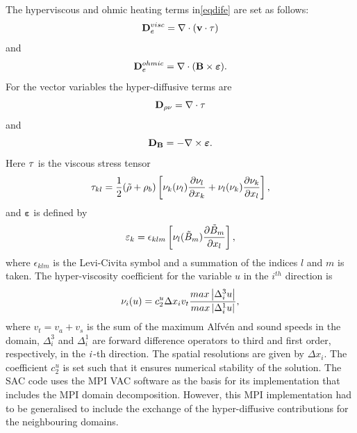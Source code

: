 The hyperviscous and ohmic heating terms in\eqref{eqdife} are set as follows:
\begin{equation}
{\bf D}_{e}^{visc}=\nabla \cdot ({\bf v}\cdot \tau )
\end{equation}
and
\begin{equation}
{\bf D}_{e}^{ohmic}=\nabla \cdot ({\bf B}\times \boldsymbol{\varepsilon} ).
\end{equation}
For the vector variables the hyper-diffusive terms are
\begin{equation}
{\bf D}_{\rho \nu}=\nabla \cdot {\bf \tau}
\end{equation}
and
\begin{equation}\label{eqdifb}
{\bf D}_{\bf B}= -\nabla \times {\boldsymbol{ \varepsilon}}.
\end{equation}
Here $ \bf \tau $ is the viscous stress tensor
\begin{equation}
\tau _{kl}={{1}\over{2}}(\tilde{\rho}+\rho _{b})\left[  \nu _{k}(\nu _{l}) {{\partial \nu_{l}}\over{\partial x_{k}}} +    \nu _{l}(\nu _{k}) {{\partial \nu_{k}}\over{\partial x_{l}}}     \right],
\end{equation}
and $  \boldsymbol{\varepsilon} $ is defined by
\begin{equation}
\varepsilon _{k}=\epsilon_{klm}\left[  \nu _{l}(\tilde{B}_{m})  {{\partial \tilde{B}_{m}}\over{\partial x_{l}}} \right],
\end{equation}
where $\epsilon_{klm}$ is the Levi-Civita symbol and a summation of the indices $l$ and $m$ is taken. The hyper-viscosity coefficient for the variable $u$ in the $i^{th}$ direction is
\begin{equation}\label{eqhyp}
\nu _{i}(u)=c_{2}^{u}\Delta x_{i}v_{t}{{max \left| \Delta_i^{3} u\right|}\over{max \left| \Delta _{i}^{1}u\right|}},
\end{equation}
where $v_{t}=v_{a}+v_{s}$ is the sum of the maximum Alfv\'{e}n and sound speeds in the domain, $\Delta^{3}_{i}$ and $\Delta^{1}_{i}$ are forward difference operators  to third and first order, respectively, in the $\it{i}$-th direction. The spatial resolutions are given by $\Delta x_{i}$. The coefficient $c_{2}^{u}$ is set such that it ensures numerical stability of the solution.
The SAC code uses the MPI VAC software as the basis for its implementation \citep{Toth 1996)} that includes the MPI domain decomposition. However, this MPI implementation had to be generalised to include the exchange of the hyper-diffusive contributions for the neighbouring domains. 




